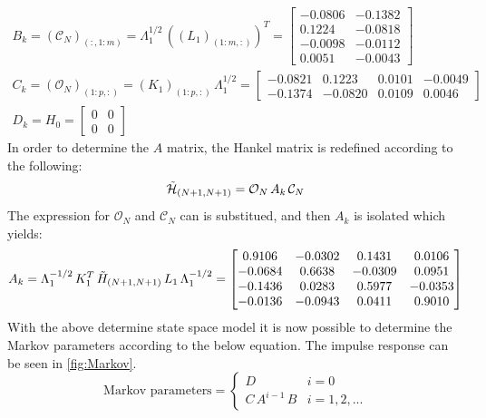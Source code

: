 \begin{equation}
    \begin{gathered}
        B_k=(\mathcal{C}_N)_{(:,1:m)}=\Lambda_1^{1/2}\,\left((L_1)_{(1:m,:)}\right)^T=
        \begin{bmatrix}
            -0.0806 & -0.1382\\
            0.1224 & -0.0818\\
            -0.0098 & -0.0112\\
            0.0051 & -0.0043
        \end{bmatrix} \\
        C_k=(\mathcal{O}_N)_{(1:p,:)}=(K_1)_{(1:p,:)}\,\Lambda_1^{1/2}=
        \begin{bmatrix}
            -0.0821 & 0.1223 & 0.0101 & -0.0049\\
            -0.1374 & -0.0820 & 0.0109 & 0.0046
        \end{bmatrix}\\
        D_k=H_0=
        \begin{bmatrix}
            0 & 0 \\
            0 & 0
        \end{bmatrix}
    \end{gathered}
    \label{eq:Hankel_mat}
\end{equation}
In order to determine the $A$ matrix, the Hankel matrix is redefined according to the following:
\begin{equation}
    \Tilde{\mathcal{H}}_{(N+1,N+1)}=\mathcal{O}_N\,A_k\,\mathcal{C}_N
\end{equation}
The expression for $\mathcal{O}_N$ and $\mathcal{C}_N$ can is substitued, and then $A_k$ is isolated which yields:
\begin{equation}
    A_k=\Lambda_1^{-1/2}\,K_1^T\,\Tilde{H}_{(N+1,N+1)}\,L_1\,\Lambda_1^{-1/2}=
    \begin{bmatrix}
        0.9106 & -0.0302 & 0.1431 & 0.0106\\
        -0.0684 & 0.6638 & -0.0309 &  0.0951\\
        -0.1436 & 0.0283 & 0.5977 & -0.0353\\
        -0.0136 & -0.0943 & 0.0411 & 0.9010
   \end{bmatrix}
\end{equation}
With the above determine state space model it is now possible to determine the Markov parameters according to the below equation. The impulse response can be seen in \cref{fig:Markov}.
\begin{equation}
    \text{Markov parameters} = \begin{cases}
        D & i=0 \\
        C\,A^{i-1}\,B & i=1,2,...
    \end{cases}
    \label{eq:Markov}
\end{equation} 
